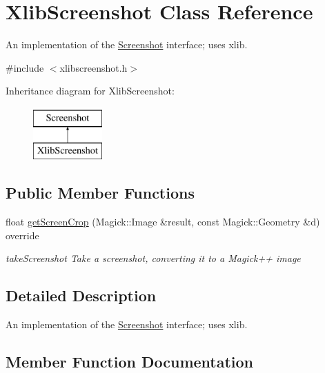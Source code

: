\hypertarget{classXlibScreenshot}{}\section{Xlib\+Screenshot Class Reference}
\label{classXlibScreenshot}


An implementation of the \hyperlink{classScreenshot}{Screenshot} interface; uses xlib.  




{\ttfamily \#include $<$xlibscreenshot.\+h$>$}

Inheritance diagram for Xlib\+Screenshot\+:\begin{figure}[H]
\begin{center}
\leavevmode
\includegraphics[height=2.000000cm]{classXlibScreenshot}
\end{center}
\end{figure}
\subsection*{Public Member Functions}
\begin{DoxyCompactItemize}
\item 
float \hyperlink{classXlibScreenshot_a6fc6b8262ef4d174804972fa5bb046be}{get\+Screen\+Crop} (Magick\+::\+Image \&result, const Magick\+::\+Geometry \&d) override
\begin{DoxyCompactList}\small\item\em take\+Screenshot Take a screenshot, converting it to a Magick++ image \end{DoxyCompactList}\end{DoxyCompactItemize}


\subsection{Detailed Description}
An implementation of the \hyperlink{classScreenshot}{Screenshot} interface; uses xlib. 

\subsection{Member Function Documentation}

